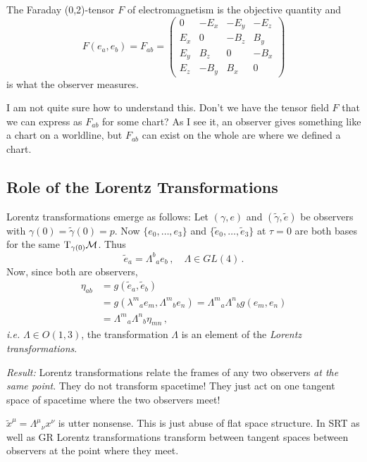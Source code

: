 \begin{example}
The Faraday (0,2)-tensor $F$ of electromagnetism is the objective quantity and
\begin{equation*}
    F(e_a, e_b) = F_{ab} = 
    \begin{pmatrix}
        0     & -E_x & -E_y & -E_z \\
        E_x &  0     & -B_z   &  B_y    \\
        E_y &  B_z   &  0     & -B_x   \\
        E_z & -B_y   &  B_x   &  0
    \end{pmatrix}
\end{equation*}
is what the observer measures.
\end{example}
\begin{note}
    I am not quite sure how to understand this.
    Don't we have the tensor field $F$ that we can express as $F_{ab}$ for some
    chart?
    As I see it, an observer gives something like a chart on a worldline, but
    $F_{ab}$ can exist on the whole are where we defined a chart.
\end{note}

\subsection{Role of the Lorentz Transformations}
Lorentz transformations emerge as follows:
Let $(\gamma, e)$ and $(\tilde{\gamma}, \tilde{e})$ be observers with
$\gamma(0) = \tilde{\gamma}(0) = p$.
Now $\{e_0, \dots, e_3\}$ and $\{\tilde{e}_0, \dots, \tilde{e}_3\}$ at $\tau=0$
are both bases for the same $\T_{\gamma(0)}\M$.
Thus
\begin{equation}
    \tilde{e}_a = \Lambda^b{}_a e_b\,,\quad \Lambda \in GL(4)\,.
\end{equation}
Now, since both are observers,
\begin{align}
    \eta_{ab} &= g(\tilde{e}_a, \tilde{e}_b)\\
    &= g\left( \lambda^m{}_a e_m, \Lambda^m{}_b e_n \right) =
    \Lambda^m{}_a \Lambda^n{}_b g(e_m, e_n) \\
    &= \Lambda^m{}_a \Lambda^n{}_b \eta_{mn}\,,
\end{align}
\textit{i.e.} $\Lambda \in O(1,3)$, the transformation $\Lambda$ is an element
of the \textit{Lorentz transformations}.

\textit{Result:} Lorentz transformations relate the frames of any two observers
\textit{at the same point}.
They do not transform spacetime! They just act on one tangent space of spacetime
where the two observers meet!
\begin{note}
    $\tilde{x}^\mu = \Lambda^\mu{}_\nu x^\nu$ is utter nonsense.
    This is just abuse of flat space structure.
    In SRT as well as GR Lorentz transformations transform between tangent spaces
    between observers at the point where they meet.
\end{note}

